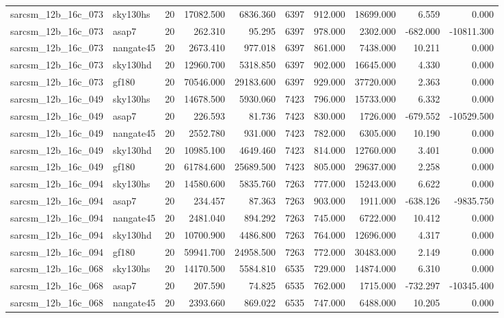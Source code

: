 \documentclass{article}
\begin{document}
\begin{longtable}{llrrrrrrrr}
sarcsm\_12b\_16c\_073 & sky130hs & 20 & 17082.500 & 6836.360 & 6397 & 912.000 & 18699.000 & 6.559 & 0.000 \\
sarcsm\_12b\_16c\_073 & asap7 & 20 & 262.310 & 95.295 & 6397 & 978.000 & 2302.000 & -682.000 & -10811.300 \\
sarcsm\_12b\_16c\_073 & nangate45 & 20 & 2673.410 & 977.018 & 6397 & 861.000 & 7438.000 & 10.211 & 0.000 \\
sarcsm\_12b\_16c\_073 & sky130hd & 20 & 12960.700 & 5318.850 & 6397 & 902.000 & 16645.000 & 4.330 & 0.000 \\
sarcsm\_12b\_16c\_073 & gf180 & 20 & 70546.000 & 29183.600 & 6397 & 929.000 & 37720.000 & 2.363 & 0.000 \\
sarcsm\_12b\_16c\_049 & sky130hs & 20 & 14678.500 & 5930.060 & 7423 & 796.000 & 15733.000 & 6.332 & 0.000 \\
sarcsm\_12b\_16c\_049 & asap7 & 20 & 226.593 & 81.736 & 7423 & 830.000 & 1726.000 & -679.552 & -10529.500 \\
sarcsm\_12b\_16c\_049 & nangate45 & 20 & 2552.780 & 931.000 & 7423 & 782.000 & 6305.000 & 10.190 & 0.000 \\
sarcsm\_12b\_16c\_049 & sky130hd & 20 & 10985.100 & 4649.460 & 7423 & 814.000 & 12760.000 & 3.401 & 0.000 \\
sarcsm\_12b\_16c\_049 & gf180 & 20 & 61784.600 & 25689.500 & 7423 & 805.000 & 29637.000 & 2.258 & 0.000 \\
sarcsm\_12b\_16c\_094 & sky130hs & 20 & 14580.600 & 5835.760 & 7263 & 777.000 & 15243.000 & 6.622 & 0.000 \\
sarcsm\_12b\_16c\_094 & asap7 & 20 & 234.457 & 87.363 & 7263 & 903.000 & 1911.000 & -638.126 & -9835.750 \\
sarcsm\_12b\_16c\_094 & nangate45 & 20 & 2481.040 & 894.292 & 7263 & 745.000 & 6722.000 & 10.412 & 0.000 \\
sarcsm\_12b\_16c\_094 & sky130hd & 20 & 10700.900 & 4486.800 & 7263 & 764.000 & 12696.000 & 4.317 & 0.000 \\
sarcsm\_12b\_16c\_094 & gf180 & 20 & 59941.700 & 24958.500 & 7263 & 772.000 & 30483.000 & 2.149 & 0.000 \\
sarcsm\_12b\_16c\_068 & sky130hs & 20 & 14170.500 & 5584.810 & 6535 & 729.000 & 14874.000 & 6.310 & 0.000 \\
sarcsm\_12b\_16c\_068 & asap7 & 20 & 207.590 & 74.825 & 6535 & 762.000 & 1715.000 & -732.297 & -10345.400 \\
sarcsm\_12b\_16c\_068 & nangate45 & 20 & 2393.660 & 869.022 & 6535 & 747.000 & 6488.000 & 10.205 & 0.000 \\

\end{longtable}
\end{document}
